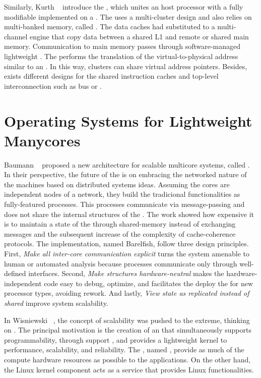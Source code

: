 	Similarly, Kurth \etal~\cite{Kurth2017} introduce the \hero, which unites an \arm
	host processor with a fully modifiable \riscv \manycore implemented on a \fpga.
	The \pmca uses a multi-cluster design and also relies on multi-banked memory, called \spm.
	The data caches had substituted to a multi-channel \dma engine that copy data
	between a shared L1 \spm and remote \spms or shared main memory.
	Communication to main memory passes through software-managed lightweight \rab.
	The \rab performs the translation of the virtual-to-physical address similar to an \mmu.
	In this way, clusters can share virtual address pointers.
	Besides, exists different designs for the shared instruction caches and
	top-level interconnection such as bus or \noc.

\section{Operating Systems for Lightweight Manycores}
\label{sec.works.os}

	Baumann \etal~\cite{Baumann2009} proposed a new \os architecture for scalable multicore
	systems, called \multikernel.
	In their perspective, the future of the \oss is on embracing the networked nature
	of the machines based on distributed systems ideas.
	Assuming the cores are independent nodes of a network, they build the tradicional
	\os functionalities as fully-featured processes.
	This processes communicate via message-passing and does not share the internal
	structures of the \os.
	The work showed how expensive it is to maintain a state of the \os through
	shared-memory instead of exchanging messages and the subsequent increase of
	the complexity of cache-coherence protocols.
	The \multikernel implementation, named Barelfish, follow three design principles.
	First, \textit{Make all inter-core communication explicit} turns the system
	amenable to human or automated analysis because processes communicate only
	through well-defined interfaces.
	Second, \textit{Make \os structures hardware-neutral} makes the hardware-independent
	code easy to debug, optimize, and facilitates the deploy the \os for new
	processor types, avoiding rework.
	And lastly, \textit{View \os state as replicated instead of shared} improve system
	scalability.

	In Wisniewski~\cite{Wisniewski2014} \etal, the concept of scalability was pushed
	to the extreme, thinking on \hpc.
	The principal motivation is the creation of an \os that simultaneously supports
	programmability, through support \linux \api, and provides a lightweight kernel
	to performance, scalability, and reliability.
	The \os, named \mos, provide as much of the compute hardware resources as
	possible to the \hpc applications. On the other hand, the Linux kernel
	component acts as a service that provides Linux functionalities.

